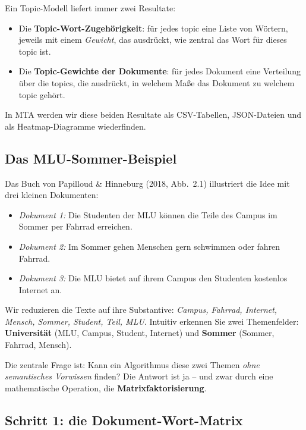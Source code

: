 \documentclass[a4paper,11pt]{article}
\begin{document}
Ein Topic-Modell liefert immer zwei Resultate:

\begin{itemize}
\item Die \textbf{Topic-Wort-Zugehörigkeit}: für jedes topic eine
Liste von Wörtern, jeweils mit einem \emph{Gewicht}, das ausdrückt,
wie zentral das Wort für dieses topic ist.

\item Die \textbf{Topic-Gewichte der Dokumente}: für jedes Dokument
eine Verteilung über die topics, die ausdrückt, in welchem Maße
das Dokument zu welchem topic gehört.
\end{itemize}

In MTA werden wir diese beiden Resultate als CSV-Tabellen, JSON-Dateien
und als Heatmap-Diagramme wiederfinden.

\subsection{Das MLU-Sommer-Beispiel}

Das Buch von Papilloud \& Hinneburg (2018, Abb.~2.1) illustriert die
Idee mit drei kleinen Dokumenten:

\begin{itemize}
\item \emph{Dokument 1:} Die Studenten der MLU können die Teile des
Campus im Sommer per Fahrrad erreichen.
\item \emph{Dokument 2:} Im Sommer gehen Menschen gern schwimmen oder
fahren Fahrrad.
\item \emph{Dokument 3:} Die MLU bietet auf ihrem Campus den Studenten
kostenlos Internet an.
\end{itemize}

Wir reduzieren die Texte auf ihre Substantive: \emph{Campus, Fahrrad,
Internet, Mensch, Sommer, Student, Teil, MLU}. Intuitiv erkennen Sie
zwei Themenfelder: \textbf{Universität} (MLU, Campus, Student, Internet)
und \textbf{Sommer} (Sommer, Fahrrad, Mensch).

Die zentrale Frage ist: Kann ein Algorithmus diese zwei Themen
\emph{ohne semantisches Vorwissen} finden? Die Antwort ist ja -- und
zwar durch eine mathematische Operation, die \textbf{Matrixfaktorisierung}.

\subsection{Schritt 1: die Dokument-Wort-Matrix}
\end{document}
